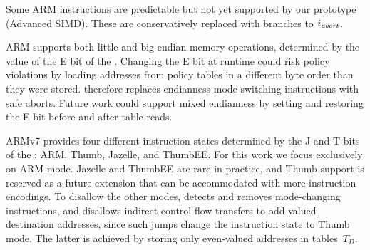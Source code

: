 
{%
    Some ARM instructions are predictable but not yet supported by our prototype (\eg Advanced SIMD).
    These are conservatively replaced with branches to $i_\mathit{abort}$.

    ARM supports both little and big endian memory operations, determined by the value of the E bit of the \CPSR.
    Changing the E bit at runtime could risk policy violations by loading addresses from policy tables in a different byte order than they were stored.
    \pname therefore replaces endianness mode-switching instructions with safe aborts.
    Future work could support mixed endianness by setting and restoring the E bit before and after table-reads.

    ARMv7 provides four different instruction states determined by the J and T bits of the \CPSR: ARM, Thumb, Jazelle, and ThumbEE.
    For this work we focus exclusively on ARM mode.
    Jazelle and ThumbEE are rare in practice, and Thumb support is reserved as a future extension that can be accommodated with more instruction encodings.
    To disallow the other modes, \pname detects and removes mode-changing instructions, and disallows indirect control-flow transfers to odd-valued destination addresses, since such jumps change the instruction state to Thumb mode.
    The latter is achieved by storing only even-valued addresses in tables~$T_D$.

}
